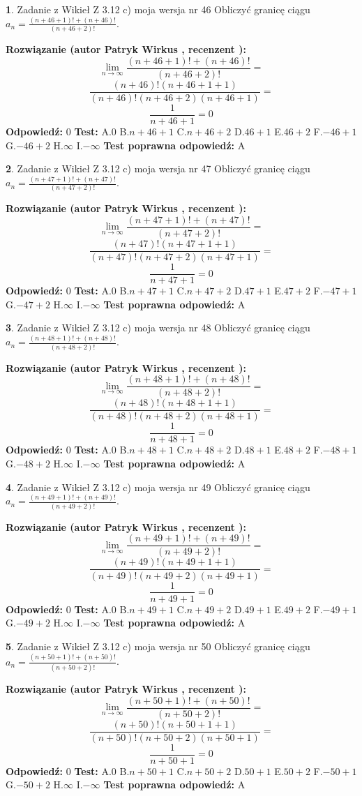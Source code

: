 \documentclass[12pt, a4paper]{article}
\theoremstyle{definition} %
\newtheorem{zad}{}
\newcommand{\zadStart}[1]{\begin{zad}#1\newline}
\newcommand{\zadStop}{\end{zad}}
\newcommand{\rozwStart}[2]{\noindent \textbf{Rozwiązanie (autor #1 , recenzent #2): }\newline}
\newcommand{\rozwStop}{\newline}
\newcommand{\odpStart}{\noindent \textbf{Odpowiedź:}\newline}
\newcommand{\odpStop}{\newline}
\newcommand{\testStart}{\noindent \textbf{Test:}\newline}
\newcommand{\testStop}{\newline}
\newcommand{\kluczStart}{\noindent \textbf{Test poprawna odpowiedź:}\newline}
\newcommand{\kluczStop}{\newline}
\begin{document}
\zadStart{Zadanie z Wikieł Z 3.12 c) moja wersja nr 46}
Obliczyć granicę ciągu $a_{n}=\frac{(n+46+1)!+(n+46)!}{(n+46+2)!}$.
\zadStop
\rozwStart{Patryk Wirkus}{}
$$\lim\limits_{n\to\infty}\frac{(n+46+1)!+(n+46)!}{(n+46+2)!}=$$
$$\frac{(n+46)!(n+46+1+1)}{(n+46)!(n+46+2)(n+46+1)}=$$
$$\frac{1}{n+46+1}= 0$$
\rozwStop
\odpStart
$0$
\odpStop
\testStart
A.$0$
B.$n+46+1$
C.$n+46+2$
D.$46+1$
E.$46+2$
F.$-46+1$
G.$-46+2$
H.$\infty$
I.$-\infty$
\testStop
\kluczStart
A
\kluczStop



\zadStart{Zadanie z Wikieł Z 3.12 c) moja wersja nr 47}
Obliczyć granicę ciągu $a_{n}=\frac{(n+47+1)!+(n+47)!}{(n+47+2)!}$.
\zadStop
\rozwStart{Patryk Wirkus}{}
$$\lim\limits_{n\to\infty}\frac{(n+47+1)!+(n+47)!}{(n+47+2)!}=$$
$$\frac{(n+47)!(n+47+1+1)}{(n+47)!(n+47+2)(n+47+1)}=$$
$$\frac{1}{n+47+1}= 0$$
\rozwStop
\odpStart
$0$
\odpStop
\testStart
A.$0$
B.$n+47+1$
C.$n+47+2$
D.$47+1$
E.$47+2$
F.$-47+1$
G.$-47+2$
H.$\infty$
I.$-\infty$
\testStop
\kluczStart
A
\kluczStop



\zadStart{Zadanie z Wikieł Z 3.12 c) moja wersja nr 48}
Obliczyć granicę ciągu $a_{n}=\frac{(n+48+1)!+(n+48)!}{(n+48+2)!}$.
\zadStop
\rozwStart{Patryk Wirkus}{}
$$\lim\limits_{n\to\infty}\frac{(n+48+1)!+(n+48)!}{(n+48+2)!}=$$
$$\frac{(n+48)!(n+48+1+1)}{(n+48)!(n+48+2)(n+48+1)}=$$
$$\frac{1}{n+48+1}= 0$$
\rozwStop
\odpStart
$0$
\odpStop
\testStart
A.$0$
B.$n+48+1$
C.$n+48+2$
D.$48+1$
E.$48+2$
F.$-48+1$
G.$-48+2$
H.$\infty$
I.$-\infty$
\testStop
\kluczStart
A
\kluczStop



\zadStart{Zadanie z Wikieł Z 3.12 c) moja wersja nr 49}
Obliczyć granicę ciągu $a_{n}=\frac{(n+49+1)!+(n+49)!}{(n+49+2)!}$.
\zadStop
\rozwStart{Patryk Wirkus}{}
$$\lim\limits_{n\to\infty}\frac{(n+49+1)!+(n+49)!}{(n+49+2)!}=$$
$$\frac{(n+49)!(n+49+1+1)}{(n+49)!(n+49+2)(n+49+1)}=$$
$$\frac{1}{n+49+1}= 0$$
\rozwStop
\odpStart
$0$
\odpStop
\testStart
A.$0$
B.$n+49+1$
C.$n+49+2$
D.$49+1$
E.$49+2$
F.$-49+1$
G.$-49+2$
H.$\infty$
I.$-\infty$
\testStop
\kluczStart
A
\kluczStop



\zadStart{Zadanie z Wikieł Z 3.12 c) moja wersja nr 50}
Obliczyć granicę ciągu $a_{n}=\frac{(n+50+1)!+(n+50)!}{(n+50+2)!}$.
\zadStop
\rozwStart{Patryk Wirkus}{}
$$\lim\limits_{n\to\infty}\frac{(n+50+1)!+(n+50)!}{(n+50+2)!}=$$
$$\frac{(n+50)!(n+50+1+1)}{(n+50)!(n+50+2)(n+50+1)}=$$
$$\frac{1}{n+50+1}= 0$$
\rozwStop
\odpStart
$0$
\odpStop
\testStart
A.$0$
B.$n+50+1$
C.$n+50+2$
D.$50+1$
E.$50+2$
F.$-50+1$
G.$-50+2$
H.$\infty$
I.$-\infty$
\testStop
\kluczStart
A
\kluczStop
\end{document}
